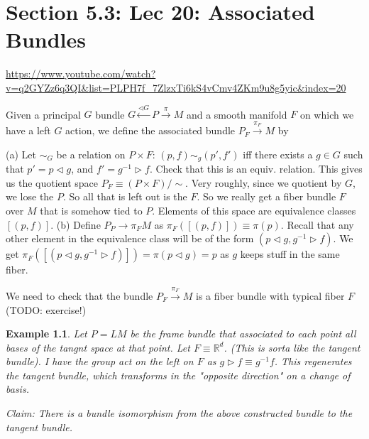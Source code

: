 \documentclass[11pt]{book}
\newtheorem{example}[theorem]{Example}
\begin{document}
\chapter{Section 5.3: Lec 20: Associated Bundles}
\url{https://www.youtube.com/watch?v=q2GYZz6q3QI&list=PLPH7f_7ZlzxTi6kS4vCmv4ZKm9u8g5yic&index=20}

Given a principal $G$ bundle $G \xleftarrow{\triangleleft G} P \xrightarrow{\pi} M$ and a smooth
manifold $F$ on which we have a left $G$ action, we define the associated bundle
$P_F \xrightarrow{\pi_F} M$ by

(a) Let $\sim_G$ be a relation on $P \times F$:
  $(p, f) \sim_g (p', f')$ iff there exists a $g \in G$ such that $p' = p \triangleleft g$,
   and $f' = g^{-1} \triangleright f$. Check that this is an equiv. relation.
   This gives us the quotient space $P_F \equiv (P \times F)/\sim$.
   Very roughly, since we quotient by $G$, we lose the $P$. So all that is left out is the $F$.
   So we really get a fiber bundle $F$ over $M$ that is somehow tied to $P$.
   Elements of this space are equivalence classes $[(p, f)]$.
(b) Define $P_P \rightarrow{\pi_F} M$ as $\pi_F([(p, f)]) \equiv \pi(p)$. Recall
    that any other element in the equivalence class will be of the form
    $(p \triangleleft g, g^{-1} \triangleright f)$. We get
    $\pi_F([(p \triangleleft g, g^{-1} \triangleright f)]) = \pi(p \triangleleft g) = p$ as $g$
    keeps stuff in the same fiber.

We need to check that the bundle $P_F \xrightarrow{\pi_F} M$ is a fiber bundle
with typical fiber $F$ (TODO: exercise!)


\begin{example}
Let $P = LM$ be the frame bundle that associated to each point all bases of the tangnt
space at that point. Let $F \equiv \mathbb R^d$. (This is sorta like the tangent bundle).
I have the group act on the left on $F$ as $g \triangleright f \equiv g^{-1} f$.
This regenerates the tangent bundle, which transforms in the "opposite direction" on a
change of basis.

Claim: There is a bundle isomorphism from the above constructed bundle to the
tangent bundle.
\end{example}
\end{document}

